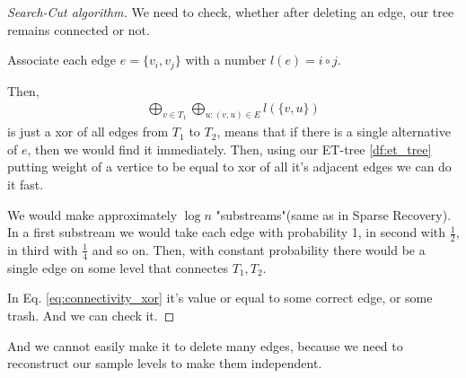\begin{proof}[Search-Cut algorithm] \label{algo:search_cut}
	We need to check, whether after deleting an edge, our tree remains connected or not.

Associate each edge $e = \{v_i, v_j\}$ with a number $l(e) = i \circ j$.

  Then, 
  \begin{align}
	  \bigoplus_{v \in T_1} \bigoplus_{u \colon (v, u) \in E} l(\{v, u\}) \label{eq:connectivity_xor}
  \end{align} is just a xor of all edges from $T_1$ to $T_2$, means that if there is a single alternative of $e$, then we would find it immediately.
  Then, using our ET-tree \ref{df:et_tree} putting weight of a vertice to be equal to xor of all it's adjacent edges we can do it fast.

  We would make approximately $\log n$ "substreams"(same as in Sparse Recovery).
  In a first substream we would take each edge with probability 1, in second with $\frac{1}{2}$, in third with $\frac{1}{4}$ and so on.
  Then, with constant probability there would be a single edge on some level that connectes $T_1, T_2$.

  In Eq. \eqref{eq:connectivity_xor} it's value or equal to some correct edge, or some trash. And we can check it.

\end{proof}

\begin{remrk}
  And we cannot easily make it to delete many edges, because we need to reconstruct our sample levels to make them independent.
\end{remrk}


